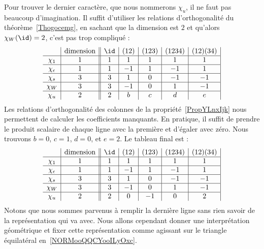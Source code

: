 Pour trouver le dernier caractère, que nous nommerons \( \chi_u\), il ne faut pas beaucoup d'imagination. Il suffit d'utiliser les relations d'orthogonalité du théorème~\ref{Thogocemg}, en sachant que la dimension est \( 2\) et qu'alors \( \chi_W(\id)=2\), c'est pas trop compliqué :
\begin{equation}    \label{EqOKtZYFQ}
	\begin{array}[]{c|c||c|c|c|c|c|}
		                & \text{dimension} & \id & (12) & (123) & (1234) & (12)(34) \\
		\hline
		\chi_1          & 1                & 1   & 1    & 1     & 1      & 1        \\
		\hline
		\chi_{\epsilon} & 1                & 1   & -1   & 1     & -1     & 1        \\
		\hline
		\chi_s          & 3                & 3   & 1    & 0     & -1     & -1       \\
		\hline
		\chi_W          & 3                & 3   & -1   & 0     & 1      & -1       \\
		\hline
		\chi_u          & 2                & 2   & b    & c     & d      & e        \\
	\end{array}
\end{equation}
Les relations d'orthogonalité des colonnes de la propriété~\ref{PropYLnxIjk} nous permettent de calculer les coefficients manquants. En pratique, il suffit de prendre le produit scalaire de chaque ligne avec la première et d'égaler avec zéro. Nous trouvons \( b=0\), \( c=1\), \( d=0\), et \( e=2\). Le tableau final est :
\begin{equation}
	\begin{array}[]{c|c||c|c|c|c|c|}
		                & \text{dimension} & \id & (12) & (123) & (1234) & (12)(34) \\
		\hline
		\chi_1          & 1                & 1   & 1    & 1     & 1      & 1        \\
		\hline
		\chi_{\epsilon} & 1                & 1   & -1   & 1     & -1     & 1        \\
		\hline
		\chi_s          & 3                & 3   & 1    & 0     & -1     & -1       \\
		\hline
		\chi_W          & 3                & 3   & -1   & 0     & 1      & -1       \\
		\hline
		\chi_u          & 2                & 2   & 0    & -1    & 0      & 2        \\
	\end{array}
\end{equation}
Notons que nous sommes parvenus à remplir la dernière ligne sans rien savoir de la représentation qui va avec. Nous allons cependant donner une interprétation géométrique et fixer cette représentation comme agissant sur le triangle équilatéral en~\ref{NORMooQQCYooILyOxc}.

